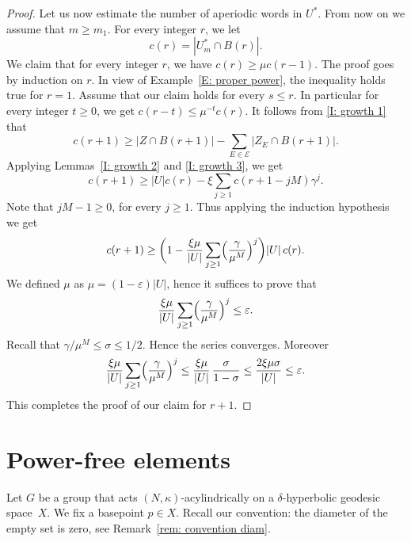 \documentclass[11pt]{article}
\let\mathcal\mathscr
\let\epsilon\varepsilon
\theoremstyle{plain}
\theoremstyle{definition}
\begin{document}
\begin{proof}
Let us now estimate the number of aperiodic words in $U^*$.
From now on we assume that $m \geq m_1$.
For every integer $r$, we let
\begin{equation*}
c(r) = | U^*_m \cap B(r)|.
\end{equation*}
We claim that for every integer $r$, we have $c(r) \geq \mu c(r-1)$.
The proof goes by induction on $r$.
In view of Example~\ref{E: proper power}, the inequality holds true for $r = 1$.
Assume that our claim holds for every $s \leq r$.
In particular for every integer $t \geq 0$, we get $c(r -t) \leq \mu^{-t}c(r)$.
It follows from \eqref{I: growth 1} that
\begin{equation*}
c(r+1) \geq | Z \cap B(r+1)| - \sum_{E \in \mathcal E} |Z_E\cap B(r+1)|.
\end{equation*}
Applying Lemmas~\ref{I: growth 2} and \ref{I: growth 3}, we get
\begin{equation*}
c(r+1) \geq |U| c(r) - \xi
\sum_{j\geqslant 1} c(r+1 -jM)\gamma^j.
\end{equation*}
Note that $jM - 1 \geq 0$, for every $j \geq 1$.
Thus applying the induction hypothesis we get
\begin{equation*}
c(r+1)
\geq \biggl( 1 -\frac {\xi\mu} {|U|}\sum_{j \geq 1} \Bigl(\frac{\gamma}{\mu^M}\Bigr)^j\biggr) |U|\, c(r).
\end{equation*}
We defined $\mu$ as $\mu = (1 - \epsilon)|U|$, hence it suffices to prove that
\begin{equation*}
\frac {\xi\mu} {|U|}\sum_{j \geq 1} \Bigl(\frac{\gamma}{\mu^M}\Bigr)^j \leq \epsilon.
\end{equation*}
Recall that $\gamma/\mu^M \leq \sigma \leq 1/2$.
Hence the series converges.
Moreover
\begin{equation*}
\frac {\xi\mu} {|U|}\sum_{j \geq 1} \Bigl(\frac{\gamma}{\mu^M}\Bigr)^j
\leq \frac {\xi\mu} {|U|}\, \frac {\sigma}{1 - \sigma}
\leq \frac {2\xi\mu\sigma} {|U|}
\leq \epsilon.
\end{equation*}
This completes the proof of our claim for $r+1$.
\end{proof}

\section{Power-free elements}
\label{sec: power-free elements}

Let $G$ be a group that acts $(N,\kappa)$-acylindrically on a $\delta$-hyperbolic geodesic space~$X$.
We fix a basepoint $p \in X$.
Recall our convention: the diameter of the empty set is zero, see Remark~\ref{rem: convention diam}.
\end{document}
